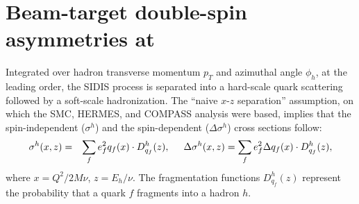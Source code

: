 \section{Beam-target double-spin asymmetries at \lo}
Integrated over hadron transverse momentum $p_T$ and azimuthal angle $\phi_h$,  at the leading order, the 
 SIDIS process is separated into a hard-scale quark scattering 
 followed by a soft-scale hadronization.
 The ``naive $x$-$z$ separation'' assumption, on which the SMC, HERMES, and COMPASS
analysis were based, implies that the spin-independent 
($\sigma^{h}$)
and the spin-dependent ($\Delta \sigma^{h}$)
  cross sections follow: 
\begin{eqnarray}  
 \sigma^{h} (x,z) & = & \sum_{f} e_f^2 q_f(x) \cdot D_{q_f}^{h}(z),  \hspace{0.5cm}
 \Delta \sigma^{h} (x,z)  =  \sum_{f} e_f^2 \Delta q_f(x) \cdot D_{q_f}^{h}(z),  
\label{eq:fact}  
\end{eqnarray}  
where $x=Q^2/2M\nu$, $z=E_h/\nu$.
 The fragmentation functions $D_{q_f}^{h}(z)$ represent the probability that a quark
 $f$ fragments into a hadron $h$.  

